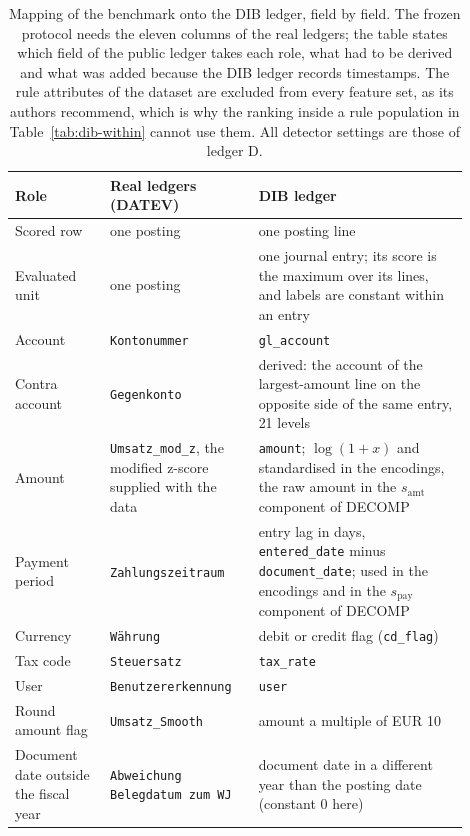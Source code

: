 \begin{table}[tbp]
\caption{Mapping of the benchmark onto the DIB ledger, field by field. The frozen protocol needs the eleven columns of the real ledgers; the table states which field of the public ledger takes each role, what had to be derived and what was added because the DIB ledger records timestamps. The rule attributes of the dataset are excluded from every feature set, as its authors recommend, which is why the ranking inside a rule population in Table~\ref{tab:dib-within} cannot use them. All detector settings are those of ledger D.}
\label{tab:dib-mapping}
\footnotesize
\setlength{\tabcolsep}{4pt}
\begin{tabular}{@{}>{\raggedright\arraybackslash}p{0.19\linewidth}>{\raggedright\arraybackslash}p{0.29\linewidth}>{\raggedright\arraybackslash}p{0.42\linewidth}@{}}
\toprule
Role & Real ledgers (DATEV) & DIB ledger \\
\midrule
Scored row & one posting & one posting line  \\
Evaluated unit & one posting & one journal entry; its score is the maximum over its lines, and labels are constant within an entry  \\
Account & \texttt{Kontonummer} & \texttt{gl\_account}  \\
Contra account & \texttt{Gegenkonto} & derived: the account of the largest-amount line on the opposite side of the same entry, 21 levels  \\
Amount & \texttt{Umsatz\_mod\_z}, the modified z-score supplied with the data & \texttt{amount}; $\log(1+x)$ and standardised in the encodings, the raw amount in the $s_{\mathrm{amt}}$ component of DECOMP  \\
Payment period & \texttt{Zahlungszeitraum} & entry lag in days, \texttt{entered\_date} minus \texttt{document\_date}; used in the encodings and in the $s_{\mathrm{pay}}$ component of DECOMP  \\
Currency & \texttt{W\"ahrung} & debit or credit flag (\texttt{cd\_flag})  \\
Tax code & \texttt{Steuersatz} & \texttt{tax\_rate}  \\
User & \texttt{Benutzererkennung} & \texttt{user}  \\
Round amount flag & \texttt{Umsatz\_Smooth} & amount a multiple of EUR 10  \\
Document date outside the fiscal year & \texttt{Abweichung Belegdatum zum WJ} & document date in a different year than the posting date (constant 0 here)  \\

\end{tabular}
\end{table}
